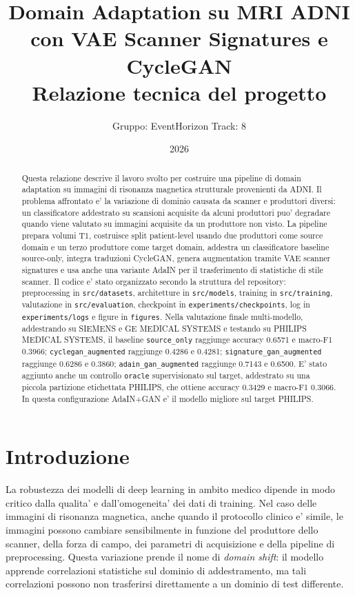 \documentclass[12pt,a4paper]{article}
\title{\textbf{Domain Adaptation su MRI ADNI con VAE Scanner Signatures e CycleGAN}\\
\large Relazione tecnica del progetto}
\author{Gruppo: EventHorizon \qquad Track: 8}
\date{2026}
\begin{document}
\maketitle

\begin{abstract}
Questa relazione descrive il lavoro svolto per costruire una pipeline di domain adaptation su immagini di risonanza magnetica strutturale provenienti da ADNI. Il problema affrontato e' la variazione di dominio causata da scanner e produttori diversi: un classificatore addestrato su scansioni acquisite da alcuni produttori puo' degradare quando viene valutato su immagini acquisite da un produttore non visto. La pipeline prepara volumi T1, costruisce split patient-level usando due produttori come source domain e un terzo produttore come target domain, addestra un classificatore baseline source-only, integra traduzioni CycleGAN, genera augmentation tramite VAE scanner signatures e usa anche una variante AdaIN per il trasferimento di statistiche di stile scanner. Il codice e' stato organizzato secondo la struttura del repository: preprocessing in \texttt{src/datasets}, architetture in \texttt{src/models}, training in \texttt{src/training}, valutazione in \texttt{src/evaluation}, checkpoint in \texttt{experiments/checkpoints}, log in \texttt{experiments/logs} e figure in \texttt{figures}. Nella valutazione finale multi-modello, addestrando su SIEMENS e GE MEDICAL SYSTEMS e testando su PHILIPS MEDICAL SYSTEMS, il baseline \texttt{source\_only} raggiunge accuracy 0.6571 e macro-F1 0.3966; \texttt{cyclegan\_augmented} raggiunge 0.4286 e 0.4281; \texttt{signature\_gan\_augmented} raggiunge 0.6286 e 0.3860; \texttt{adain\_gan\_augmented} raggiunge 0.7143 e 0.6500. E' stato aggiunto anche un controllo \texttt{oracle} supervisionato sul target, addestrato su una piccola partizione etichettata PHILIPS, che ottiene accuracy 0.3429 e macro-F1 0.3066. In questa configurazione AdaIN+GAN e' il modello migliore sul target PHILIPS.
\end{abstract}

\tableofcontents
\newpage

\section{Introduzione}

La robustezza dei modelli di deep learning in ambito medico dipende in modo critico dalla qualita' e dall'omogeneita' dei dati di training. Nel caso delle immagini di risonanza magnetica, anche quando il protocollo clinico e' simile, le immagini possono cambiare sensibilmente in funzione del produttore dello scanner, della forza di campo, dei parametri di acquisizione e della pipeline di preprocessing. Questa variazione prende il nome di \emph{domain shift}: il modello apprende correlazioni statistiche sul dominio di addestramento, ma tali correlazioni possono non trasferirsi direttamente a un dominio di test differente.
\end{document}
